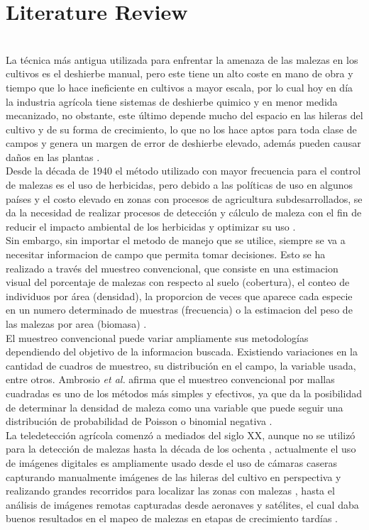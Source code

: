 \documentclass[journal,article,submit,moreauthors,pdftex]{Definitions/mdpi}
\begin{document}
\section{Literature Review}
\\
La técnica más antigua utilizada para enfrentar la amenaza de las malezas en los cultivos es el deshierbe manual, pero este tiene un alto coste en mano de obra y tiempo que lo hace ineficiente en cultivos a mayor escala, por lo cual hoy en día la industria agrícola tiene sistemas de deshierbe quimico y en menor medida mecanizado, no obstante, este último  depende mucho del espacio en las hileras del cultivo y de su forma de crecimiento, lo que no los hace aptos para toda clase de campos y genera un margen de error de deshierbe elevado, además pueden causar daños en las plantas \cite{c2}. 
\\
Desde la década de 1940 el método utilizado con mayor frecuencia para el control de malezas es el uso de herbicidas, pero debido a las políticas de uso en algunos países y el costo elevado en zonas con procesos de agricultura subdesarrollados, se da la necesidad de realizar procesos de detección y cálculo de maleza con el fin de reducir el impacto ambiental de los herbicidas y optimizar su uso \cite{c5}.
\\
Sin embargo, sin importar el metodo de manejo que se utilice, siempre se va a necesitar informacion de campo que permita tomar decisiones. Esto se ha realizado a través del muestreo convencional, que consiste en una estimacion visual del porcentaje de malezas con respecto al suelo (cobertura), el conteo de individuos por área (densidad), la proporcion de veces que aparece cada especie en un numero determinado de muestras (frecuencia) o la estimacion del peso de las malezas por area (biomasa) \cite{c58}.
\\
El muestreo convencional puede variar ampliamente sus metodologías dependiendo del objetivo de la informacion buscada. Existiendo variaciones en la cantidad de cuadros de muestreo, su distribución en el campo, la variable usada, entre otros. Ambrosio \textit{et al.} \cite{c3} afirma que el muestreo convencional por mallas cuadradas es uno de los métodos más simples y efectivos, ya que da la posibilidad de determinar la densidad de maleza como una variable que puede seguir una distribución de probabilidad de Poisson o binomial negativa \cite{c4}. 
\\
La teledetección agrícola comenzó a mediados del siglo XX, aunque no se utilizó para la detección de malezas hasta la década de los ochenta \cite{c49}, actualmente el uso de imágenes digitales es ampliamente usado desde el uso de cámaras caseras capturando manualmente imágenes de las hileras del cultivo en perspectiva y realizando grandes recorridos para localizar las zonas con malezas  \cite{c20}, hasta el  análisis de imágenes remotas capturadas desde aeronaves y  satélites, el cual daba buenos resultados en el mapeo de malezas en etapas de crecimiento tardías \cite{c41}\cite{c42}.
\end{document}
